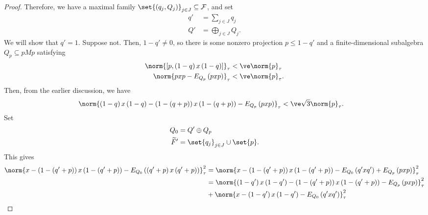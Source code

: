\documentclass[10pt]{mypackage}
\begin{document}
\begin{proof}
  Therefore, we have a maximal family $ \set{\left( q_j,Q_j \right)}_{j\in J}\subseteq \mathcal{F} $, and set
  \begin{align*}
    q' &= \sum_{j\in J}q_j\\
    Q' &= \bigoplus_{j\in J}Q_j.
  \end{align*}
  We will show that $q' = 1$. Suppose not. Then, $1-q'\neq 0$, so there is some nonzero projection $p\leq 1-q'$ and a finite-dimensional subalgebra $Q_p\subseteq pMp$ satisfying
  \begin{align*}
    \norm{\left[ p,\left( 1-q \right)x\left( 1-q \right) \right]}_{\tau} &< \ve\norm{p}_{\tau}\\
    \norm{pxp - E_{Q_p}\left( pxp \right)}_{\tau} &< \ve \norm{p}_{\tau}.
  \end{align*}
  Then, from the earlier discussion, we have
  \begin{align*}
    \norm{\left( 1-q \right)x\left( 1-q \right) - \left( 1-\left( q + p \right) \right)x\left( 1-\left( q+p \right) \right) - E_{Q_p}\left( pxp \right)}_{\tau} &< \ve\sqrt{3}\norm{p}_{\tau}.
  \end{align*}
  Set
  \begin{align*}
    Q_0 &= Q' \oplus Q_p\\
    \widetilde{F}' &= \set{q_j}_{j\in J}\cup\set{p}.
  \end{align*}
  This gives
  {\small\begin{align*}
    \norm{x-\left( 1-\left( q' + p \right) \right)x\left( 1-\left( q'+p \right) \right) - E_{Q_0}\left( \left( q'+p \right)x\left( q'+p \right) \right)}_{\tau}^2 &= \norm{x- \left( 1-\left( q'+p \right) \right)x\left( 1-\left( q'+p \right) \right) - E_{Q_0}\left( q' xq' \right) + E_{Q_p}\left( pxp \right)}_{\tau}^2\\
                                                                                                                                                                          &= \norm{\left( 1-q' \right)x\left( 1-q' \right) - \left( 1-\left( q'+p \right) \right)x\left( 1-\left( q'+p \right) \right) - E_{Q_p}\left( pxp \right)}_{\tau}^2\\
                                                                                                                                                                                                                                                                                                                                                                                                                                                                                                                                          &+ \norm{x-\left( 1-q' \right)x\left( 1-q' \right) - E_{Q_0}\left( q'xq' \right)}_{\tau}^2\\

\end{align*}}
\end{proof}
\end{document}
